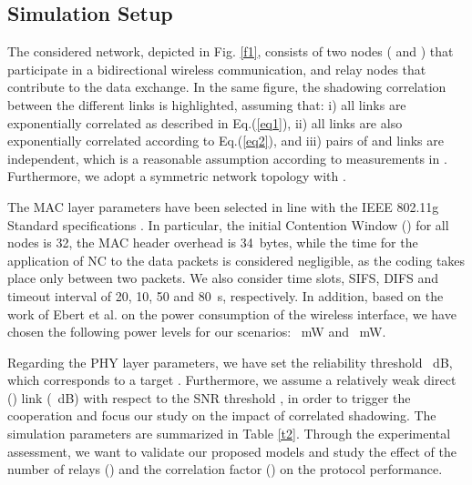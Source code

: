 \documentclass[12pt,draftcls, onecolumn]{IEEEtran}
\begin{document}
\subsection{Simulation Setup}
\label{sec:setup}

The considered network, depicted in Fig. \ref{f1}, consists of two nodes ( and ) that participate in a bidirectional wireless communication, and  relay nodes that contribute to the data exchange. In the same figure, the shadowing correlation between the different links is highlighted, assuming that: i) all  links are exponentially correlated as described in Eq.(\ref{eq1}), ii) all  links are also exponentially correlated according to Eq.(\ref{eq2}), and iii) pairs of  and  links are independent, which is a reasonable assumption according to measurements in \cite{cor1}. Furthermore, we adopt a symmetric network topology with .

The MAC layer parameters have been selected in line with the IEEE 802.11g Standard specifications \cite{80211std}. In particular, the initial Contention Window () for all nodes is 32, the MAC header overhead is 34~bytes, while the time for the application of NC to the data packets is considered negligible, as the coding takes place only between two packets. We also consider time slots, SIFS, DIFS and timeout interval of 20, 10, 50 and 80~s, respectively. In addition, based on the work of Ebert et al. \cite{ebert} on the power consumption of the wireless interface, we have chosen the following power levels for our scenarios: ~mW and ~mW.

Regarding the PHY layer parameters, we have set the reliability threshold ~dB, which corresponds to a target . Furthermore, we assume a relatively weak direct () link (~dB) with respect to the SNR threshold , in order to trigger the cooperation and focus our study on the impact of correlated shadowing. The simulation parameters are summarized in Table \ref{t2}. Through the experimental assessment, we want to validate our proposed models and study the effect of the number of relays () and the correlation factor () on the protocol performance.
\end{document}
